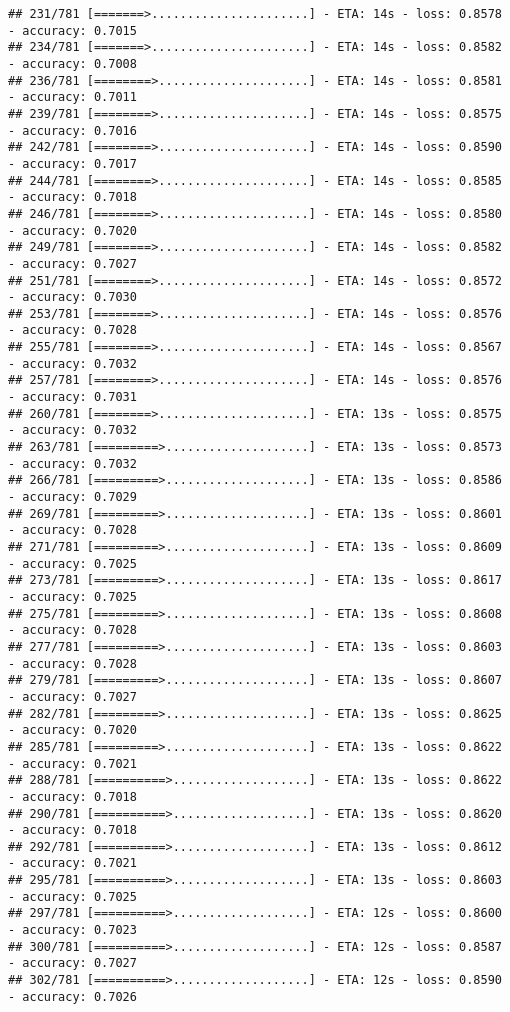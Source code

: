 \documentclass[
]{article}
\begin{document}
\begin{verbatim}
## 231/781 [=======>......................] - ETA: 14s - loss: 0.8578 - accuracy: 0.7015
## 234/781 [=======>......................] - ETA: 14s - loss: 0.8582 - accuracy: 0.7008
## 236/781 [========>.....................] - ETA: 14s - loss: 0.8581 - accuracy: 0.7011
## 239/781 [========>.....................] - ETA: 14s - loss: 0.8575 - accuracy: 0.7016
## 242/781 [========>.....................] - ETA: 14s - loss: 0.8590 - accuracy: 0.7017
## 244/781 [========>.....................] - ETA: 14s - loss: 0.8585 - accuracy: 0.7018
## 246/781 [========>.....................] - ETA: 14s - loss: 0.8580 - accuracy: 0.7020
## 249/781 [========>.....................] - ETA: 14s - loss: 0.8582 - accuracy: 0.7027
## 251/781 [========>.....................] - ETA: 14s - loss: 0.8572 - accuracy: 0.7030
## 253/781 [========>.....................] - ETA: 14s - loss: 0.8576 - accuracy: 0.7028
## 255/781 [========>.....................] - ETA: 14s - loss: 0.8567 - accuracy: 0.7032
## 257/781 [========>.....................] - ETA: 14s - loss: 0.8576 - accuracy: 0.7031
## 260/781 [========>.....................] - ETA: 13s - loss: 0.8575 - accuracy: 0.7032
## 263/781 [=========>....................] - ETA: 13s - loss: 0.8573 - accuracy: 0.7032
## 266/781 [=========>....................] - ETA: 13s - loss: 0.8586 - accuracy: 0.7029
## 269/781 [=========>....................] - ETA: 13s - loss: 0.8601 - accuracy: 0.7028
## 271/781 [=========>....................] - ETA: 13s - loss: 0.8609 - accuracy: 0.7025
## 273/781 [=========>....................] - ETA: 13s - loss: 0.8617 - accuracy: 0.7025
## 275/781 [=========>....................] - ETA: 13s - loss: 0.8608 - accuracy: 0.7028
## 277/781 [=========>....................] - ETA: 13s - loss: 0.8603 - accuracy: 0.7028
## 279/781 [=========>....................] - ETA: 13s - loss: 0.8607 - accuracy: 0.7027
## 282/781 [=========>....................] - ETA: 13s - loss: 0.8625 - accuracy: 0.7020
## 285/781 [=========>....................] - ETA: 13s - loss: 0.8622 - accuracy: 0.7021
## 288/781 [==========>...................] - ETA: 13s - loss: 0.8622 - accuracy: 0.7018
## 290/781 [==========>...................] - ETA: 13s - loss: 0.8620 - accuracy: 0.7018
## 292/781 [==========>...................] - ETA: 13s - loss: 0.8612 - accuracy: 0.7021
## 295/781 [==========>...................] - ETA: 13s - loss: 0.8603 - accuracy: 0.7025
## 297/781 [==========>...................] - ETA: 12s - loss: 0.8600 - accuracy: 0.7023
## 300/781 [==========>...................] - ETA: 12s - loss: 0.8587 - accuracy: 0.7027
## 302/781 [==========>...................] - ETA: 12s - loss: 0.8590 - accuracy: 0.7026

\end{verbatim}
\end{document}
